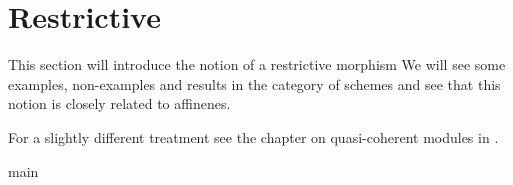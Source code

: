 \chapter{Restrictive}
This section will introduce the notion of a restrictive morphism
We will see some examples, non-examples and results in the category of schemes
and see that this notion is closely related to affinenes.

For a slightly different treatment see the chapter on quasi-coherent modules in \cite{vakil}.

{main}
